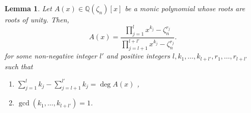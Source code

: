 \documentclass[11pt, reqno]{amsart}
\theoremstyle{plain}
\newtheorem{lem}[theo]{Lemma}
\theoremstyle{definition}
\newcommand{\Q}{\mathbb{Q}}
\begin{document}
\begin{lem}\label{lem:generalizing-cyclotomics}
Let $A(x) \in \Q(\zeta_n)[x]$ be a monic polynomial whose roots are roots of unity. Then,
\begin{equation}\label{eq:lem-decompos}
    A(x) = \frac{\prod_{j=1}^{l} x^{k_j}-\zeta_n^{r_j}}{\prod_{j=l+1}^{l+l'} x^{k_j}-\zeta_n^{r_j}}.
\end{equation}
for some non-negative integer $l'$ and positive integers $l, k_1,\dots, k_{l+l'},r_1, \dots,r_{l+l'}$ such that 
\begin{enumerate}
    \item $\sum_{j=1}^{l} k_j -  \sum_{j=l+1}^{l'} k_j= \deg A(x)$ \label{condition-1},
    \item $\gcd(k_1,\dots, k_{l+l'})=1$.\label{condition-2}
\end{enumerate}
\end{lem}
\end{document}
